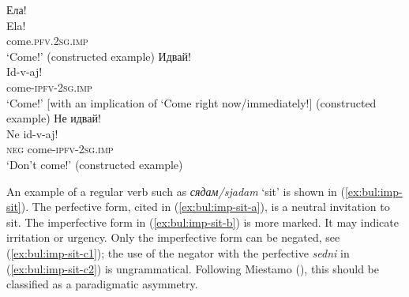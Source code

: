 \documentclass[output=paper,colorlinks=true, citecolor=brown]{langscibook}
\begin{document}
\ea \label{ex:bul:imp-7}
    \ea Ела!\label{ex:bul:imp-7a}\\ 
      	\gll Ela!\\
            come.\textsc{pfv.2sg.imp}\\
        \glt `Come!' (constructed example)
    \ex Идвай!\label{ex:bul:imp-7c}\\
        \gll Id-v-aj!\\
            come-\textsc{ipfv-2sg.imp}\\
        \glt `Come!' [with an implication of `Come right now\slash immediately!] (constructed example)
    \ex Не идвай!\label{ex:bul:imp-7b}\\
      	\gll Ne id-v-aj!\\
      	 \textsc{neg} come-\textsc{ipfv}-\textsc{2sg.imp}\\
        \glt `Don't come!' (constructed example)
    \z 
\z 

An example of a regular verb such as \textit{сядам\slash sjadam} `sit' is shown in (\ref{ex:bul:imp-sit}). The perfective form, cited in (\ref{ex:bul:imp-sit-a}), is a neutral invitation to sit. The imperfective form in (\ref{ex:bul:imp-sit-b}) is more marked. It may indicate irritation or urgency. Only the imperfective form can be negated, see (\ref{ex:bul:imp-sit-c1}); the use of the negator with the perfective \textit{sedni} in (\ref{ex:bul:imp-sit-c2}) is ungrammatical. Following Miestamo (\citeyear{Miestamo2005}), this should be classified as a paradigmatic asymmetry. 
\ea \label{ex:bul:imp-sit}
    \z 
\z 
\end{document}
